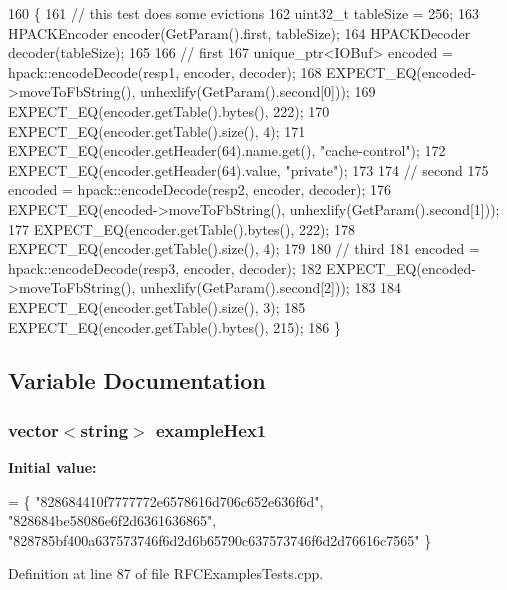 \begin{DoxyCode}
160                                             \{
161   \textcolor{comment}{// this test does some evictions}
162   uint32\_t tableSize = 256;
163   HPACKEncoder encoder(GetParam().first, tableSize);
164   HPACKDecoder decoder(tableSize);
165 
166   \textcolor{comment}{// first}
167   unique\_ptr<IOBuf> encoded = hpack::encodeDecode(resp1, encoder, decoder);
168   EXPECT\_EQ(encoded->moveToFbString(), unhexlify(GetParam().second[0]));
169   EXPECT\_EQ(encoder.getTable().bytes(), 222);
170   EXPECT\_EQ(encoder.getTable().size(), 4);
171   EXPECT\_EQ(encoder.getHeader(64).name.get(), \textcolor{stringliteral}{"cache-control"});
172   EXPECT\_EQ(encoder.getHeader(64).value, \textcolor{stringliteral}{"private"});
173 
174   \textcolor{comment}{// second}
175   encoded = hpack::encodeDecode(resp2, encoder, decoder);
176   EXPECT\_EQ(encoded->moveToFbString(), unhexlify(GetParam().second[1]));
177   EXPECT\_EQ(encoder.getTable().bytes(), 222);
178   EXPECT\_EQ(encoder.getTable().size(), 4);
179 
180   \textcolor{comment}{// third}
181   encoded = hpack::encodeDecode(resp3, encoder, decoder);
182   EXPECT\_EQ(encoded->moveToFbString(), unhexlify(GetParam().second[2]));
183 
184   EXPECT\_EQ(encoder.getTable().size(), 3);
185   EXPECT\_EQ(encoder.getTable().bytes(), 215);
186 \}
\end{DoxyCode}


\subsection{Variable Documentation}
\subsubsection[{example\+Hex1}]{\setlength{\rightskip}{0pt plus 5cm}vector$<$string$>$ example\+Hex1}\label{RFCExamplesTests_8cpp_a4cf5abdea0d1e860e03dbbde8646fe28}
{\bfseries Initial value\+:}
\begin{DoxyCode}
= \{
  \textcolor{stringliteral}{"828684410f7777772e6578616d706c652e636f6d"},
  \textcolor{stringliteral}{"828684be58086e6f2d6361636865"},
  \textcolor{stringliteral}{"828785bf400a637573746f6d2d6b65790c637573746f6d2d76616c7565"}
\}
\end{DoxyCode}


Definition at line 87 of file R\+F\+C\+Examples\+Tests.\+cpp.


